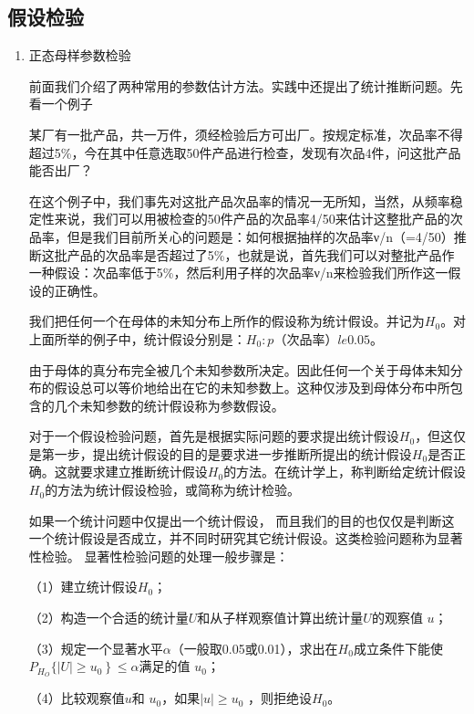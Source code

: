 \subsection{假设检验}
	\begin{enumerate}[1)]
		\item 正态母样参数检验
		\setlength{\parindent}{2\ccwd}
		
		前面我们介绍了两种常用的参数估计方法。实践中还提出了统计推断问题。先看一个例子
		
		\begin{myexample}
			某厂有一批产品，共一万件，须经检验后方可出厂。按规定标准，次品率不得超过5\%，今在其中任意选取50件产品进行检查，发现有次品4件，问这批产品能否出厂？
		
			在这个例子中，我们事先对这批产品次品率的情况一无所知，当然，从频率稳定性来说，我们可以用被检查的50件产品的次品率4/50来估计这整批产品的次品率，但是我们目前所关心的问题是：如何根据抽样的次品率ν/n（=4/50）推断这批产品的次品率是否超过了5\%，也就是说，首先我们可以对整批产品作一种假设：次品率低于5\%，然后利用子样的次品率ν/n来检验我们所作这一假设的正确性。
			
			我们把任何一个在母体的未知分布上所作的假设称为统计假设。并记为$ H_0 $。对上面所举的例子中，统计假设分别是：$H_0:p$（次品率）$ le 0.05 $。
			
			由于母体的真分布完全被几个未知参数所决定。因此任何一个关于母体未知分布的假设总可以等价地给出在它的未知参数上。这种仅涉及到母体分布中所包含的几个未知参数的统计假设称为参数假设。
			
			对于一个假设检验问题，首先是根据实际问题的要求提出统计假设$ H_0 $，但这仅是第一步，提出统计假设的目的是要求进一步推断所提出的统计假设$ H_0 $是否正确。这就要求建立推断统计假设$ H_0 $的方法。在统计学上，称判断给定统计假设$ H_0 $的方法为统计假设检验，或简称为统计检验。
			
			如果一个统计问题中仅提出一个统计假设， 而且我们的目的也仅仅是判断这一个统计假设是否成立，并不同时研究其它统计假设。这类检验问题称为显著性检验。
			显著性检验问题的处理一般步骤是：
			
			（1）建立统计假设$ H_0 $；
			
			（2）构造一个合适的统计量$ U $和从子样观察值计算出统计量$ U $的观察值 $ u $；
			
			（3）规定一个显著水平$ \alpha $（一般取0.05或0.01），求出在$ H_0 $成立条件下能使$ P_{H_O}\{|U|\left.\geqslant u_{0}\right\} \leq \alpha $满足的值 $ u_0 $；
			
			（4）比较观察值$ u $和 $ u_0 $，如果$ |u| \ge u_0 $ ，则拒绝设$ H_0 $。
			

\end{myexample}
\end{enumerate}
